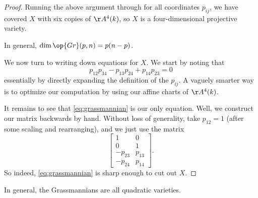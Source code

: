 \begin{proof}
	Running the above argument through for all coordinates $p_{ij}$, we have covered $X$ with six copies of $\AA^4(k)$, so $X$ is a four-dimensional projective variety.
	\begin{remark}
		In general, $\dim\op{Gr}(p,n)=p(n-p)$.
	\end{remark}
	We now turn to writing down equations for $X$. We start by noting that
	\[p_{12}p_{34}-p_{13}p_{24}+p_{14}p_{23}=0\tag{$*$}\label{eq:grassmannian}\]
	essentially by directly expanding the definition of the $p_{ij}$. A vaguely smarter way is to optimize our computation by using our affine charts of $\AA^4(k)$.

	It remains to see that \autoref{eq:grassmannian} is our only equation. Well, we construct our matrix backwards by hand. Without loss of generality, take $p_{12}=1$ (after some scaling and rearranging), and we just use the matrix
	\[\begin{bmatrix}
		1 & 0 \\
		0 & 1 \\
		-p_{23} & p_{13} \\
		-p_{24} & p_{14}
	\end{bmatrix}.\]
	So indeed, \autoref{eq:grassmannian} is sharp enough to cut out $X$.
\end{proof}
\begin{remark}
	In general, the Grassmannians are all quadratic varieties.
\end{remark}

